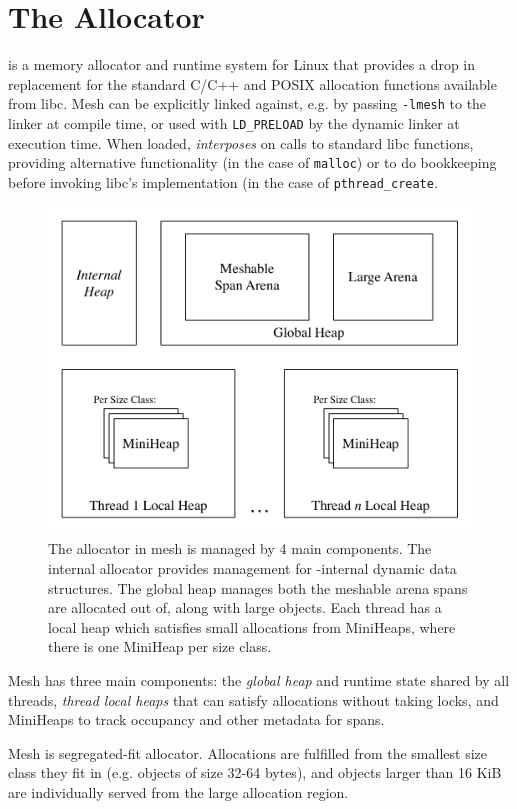 \section{The \Mesh Allocator}
\label{sec:allocator}



\Mesh is a memory allocator and runtime system for Linux that provides
a drop in replacement for the standard C/C++ and POSIX allocation
functions available from libc.  Mesh can be explicitly linked against,
e.g. by passing \texttt{-lmesh} to the linker at compile time, or used
with \texttt{LD\_PRELOAD} by the dynamic linker at execution time.
When loaded, \Mesh \textit{interposes} on calls to standard libc
functions, providing alternative functionality (in the case of
\texttt{malloc}) or to do bookkeeping before invoking libc's
implementation (in the case of \texttt{pthread\_create}.

\begin{figure}
  \includegraphics[width=.5\textwidth]{figures/global_heap}
  \caption{The allocator in mesh is managed by 4 main components.  The
    internal allocator provides management for \Mesh-internal dynamic
    data structures.  The global heap manages both the meshable arena
    spans are allocated out of, along with large objects.  Each thread
    has a local heap which satisfies small allocations from MiniHeaps,
    where there is one MiniHeap per size class.}
  \label{fig:global-heap}
\end{figure}

Mesh has three main components: the \textit{global heap} and runtime
state shared by all threads, \textit{thread local heaps} that can
satisfy allocations without taking locks, and MiniHeaps to track
occupancy and other metadata for spans.

Mesh is segregated-fit allocator.  Allocations are fulfilled from the
smallest size class they fit in (e.g. objects of size 32-64 bytes),
and objects larger than 16 KiB are individually served from the large
allocation region.

